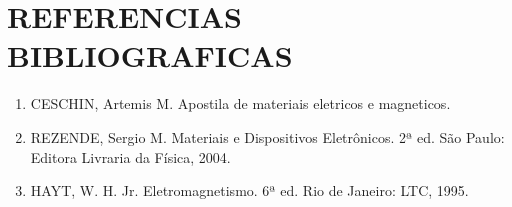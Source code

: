 \documentclass[10pt,twocolumn,letterpaper]{article}
\begin{document}
\section{REFERENCIAS BIBLIOGRAFICAS}

{\small
\begin{enumerate}

    \item CESCHIN, Artemis M. Apostila de materiais eletricos e magneticos.

    \item REZENDE, Sergio M. Materiais e Dispositivos Eletrônicos. 2ª ed. São Paulo: Editora Livraria da Física, 2004.

    \item HAYT, W. H. Jr. Eletromagnetismo. 6ª ed. Rio de Janeiro: LTC, 1995.
    
\end{enumerate}
}
\end{document}
